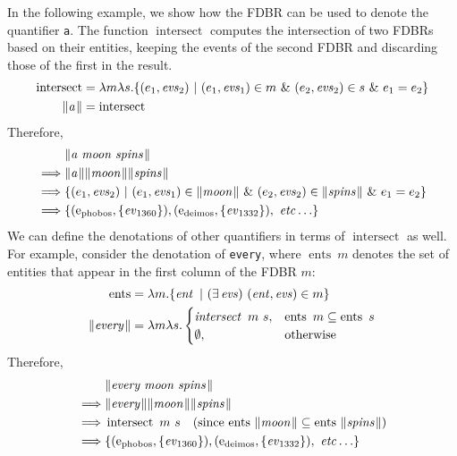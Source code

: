 \documentclass[../main.tex]{subfiles}
\begin{document}
\begin{refsection}
In the following example, we show how the FDBR can be used to denote the quantifier \texttt{a}.  The function $\operatorname{intersect}$ computes the intersection of two FDBRs based on their entities, keeping the events of the second FDBR and discarding those of the first in the result.
\begin{equation*}
	\begin{split}
		\operatorname{intersect} &= \lambda m \lambda s.\{(e_1,\evs_2)\ |\ (e_1,\evs_1) \in m\ \&\ (e_2,\evs_2) \in s\ \&\ e_1 = e_2\} \\
		\meaningof{a} &= \operatorname{intersect}
	\end{split}
\end{equation*}
Therefore,
\begin{equation*}
	\begin{split}
		&\meaningof{a\ moon\ spins} \\
		\implies & \meaningof{a} \meaningof{moon} \meaningof{spins} \\
		\implies & \{(e_1,\evs_2)\ |\ (e_1,\evs_1) \in \meaningof{moon}\ \&\ (e_2,\evs_2) \in \meaningof{spins}\ \&\ e_1 = e_2\} \\
		\implies & \{(\entityassoc{phobos}, \{\eventassoc{1360}\}), (\entityassoc{deimos}, \{\eventassoc{1332}\}),\ \etc\}
	\end{split}
\end{equation*}
We can define the denotations of other quantifiers in terms of $\operatorname{intersect}$ as well.  For example, consider the denotation of \texttt{every}, where $\operatorname{ents}\ m$ denotes the set of entities that appear in the first column of the FDBR $m$:
\begin{equation*}
	\begin{split}
		\operatorname{ents} &= \lambda m. \{ \operatorname{\mathit{ent}}\ |\ (\exists \operatorname{\mathit{evs}})\ (\operatorname{\mathit{ent}}, \operatorname{\mathit{evs}}) \in m \} \\
		\lVert\textit{every\hspace{0.1em}}\rVert &= \lambda m \lambda s.
		\begin{cases}
			\operatorname{\mathit{intersect}}\ m\ s, & \operatorname{ents}\ m \subseteq \operatorname{ents}\ s \\
			\emptyset, & \text{otherwise}
		\end{cases}
	\end{split}
\end{equation*}
Therefore,
\begin{equation*}
	\begin{split}
		&\meaningof{every moon spins} \\
		\implies & \meaningof{every} \meaningof{moon} \meaningof{spins} \\
		\implies & \operatorname{intersect}\ m\ s\quad\dmathrm{(since $\operatorname{ents}\ \meaningof{moon} \subseteq \operatorname{ents}\ \meaningof{spins}$)} \\
		\implies & \{(\entityassoc{phobos}, \{\eventassoc{1360}\}), (\entityassoc{deimos}, \{\eventassoc{1332}\}),\ \etc\}
	\end{split}
\end{equation*}


\end{refsection}
\end{document}
